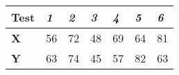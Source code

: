 \documentclass{article}
\begin{document}
\begin{tabular}{ |p{1.5cm}||p{1.5cm}|p{1.5cm}|p{1.5cm}|p{1.5cm}|p{1.5cm}|p{1.5cm}|   }
 \hline
  \textbf{Test} & \textit{1} & \textit{2} & \textit{3} & \textit{4} & \textit{5} & \textit{6} \\
 \hline
 \textbf{X} & 56 & 72 & 48 & 69 & 64 & 81 \\
 \textbf{Y} & 63 & 74 & 45 & 57 & 82 & 63 \\
 \hline
\end{tabular}
\end{document}
